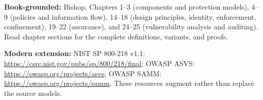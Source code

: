 \documentclass[
  letterpaper,
]{article}
\begin{document}
\textbf{Book-grounded:} Bishop, Chapters 1--3 (components and protection
models), 4--9 (policies and information flow), 14--18 (design
principles, identity, enforcement, confinement), 19--22 (assurance), and
24--25 (vulnerability analysis and auditing). Read chapter sections for
the complete definitions, variants, and proofs.

\textbf{Modern extension:} NIST SP 800-218 v1.1:
\url{https://csrc.nist.gov/pubs/sp/800/218/final}; OWASP ASVS:
\url{https://owasp.org/projects/asvs}; OWASP SAMM:
\url{https://owasp.org/projects/samm}. These resources augment rather
than replace the source models.
\end{document}
